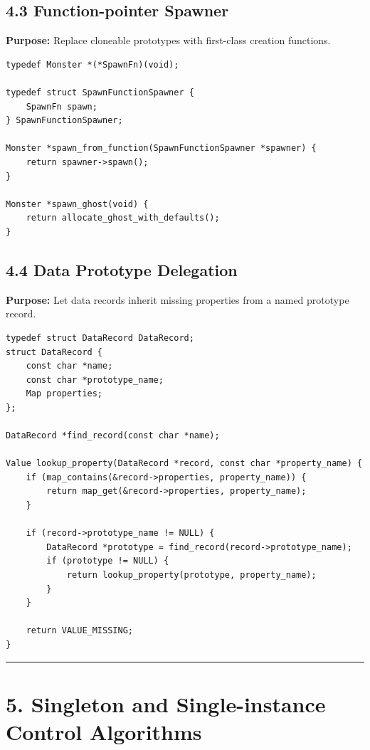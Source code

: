 \documentclass[10pt,letterpaper]{article}
\begin{document}
\subsection{4.3 Function-pointer Spawner}

\textbf{Purpose:} Replace cloneable prototypes with first-class creation functions.

\begin{verbatim}
typedef Monster *(*SpawnFn)(void);

typedef struct SpawnFunctionSpawner {
    SpawnFn spawn;
} SpawnFunctionSpawner;

Monster *spawn_from_function(SpawnFunctionSpawner *spawner) {
    return spawner->spawn();
}

Monster *spawn_ghost(void) {
    return allocate_ghost_with_defaults();
}
\end{verbatim}

\subsection{4.4 Data Prototype Delegation}

\textbf{Purpose:} Let data records inherit missing properties from a named prototype record.

\begin{verbatim}
typedef struct DataRecord DataRecord;
struct DataRecord {
    const char *name;
    const char *prototype_name;
    Map properties;
};

DataRecord *find_record(const char *name);

Value lookup_property(DataRecord *record, const char *property_name) {
    if (map_contains(&record->properties, property_name)) {
        return map_get(&record->properties, property_name);
    }

    if (record->prototype_name != NULL) {
        DataRecord *prototype = find_record(record->prototype_name);
        if (prototype != NULL) {
            return lookup_property(prototype, property_name);
        }
    }

    return VALUE_MISSING;
}
\end{verbatim}

\medskip\hrule\medskip

\clearpage
\section{5. Singleton and Single-instance Control Algorithms}
\end{document}
